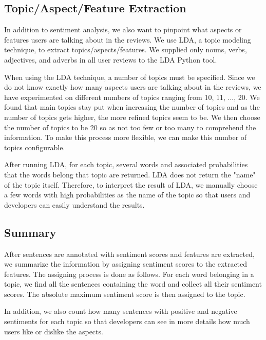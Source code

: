 \subsection{Topic/Aspect/Feature Extraction}
In addition to sentiment analysis, we also want to pinpoint what aspects or features users are talking about in the reviews. We use LDA, a topic modeling technique, to extract topics/aspects/features. We supplied only nouns, verbs, adjectives, and adverbs in all user reviews to the LDA Python tool. 

When using the LDA technique, a number of topics must be specified. Since we do not know exactly how many aspects users are talking about in the reviews, we have experimented on different numbers of topics ranging from 10, 11, ..., 20. We found that main topics stay put when increasing the number of topics and as the number of topics gets higher, the more refined topics seem to be. We then choose the number of topics to be 20 so as not too few or too many to comprehend the information. To make this process more flexible, we can make this number of topics configurable.

After running LDA, for each topic, several words and associated probabilities that the words belong that topic are returned. LDA does not return the "name" of the topic itself. Therefore, to interpret the result of LDA, we manually choose a few words with high probabilities as the name of the topic so that users and developers can easily understand the results.

\subsection{Summary}
\label{Summary}
After sentences are annotated with sentiment scores and features are extracted, we summarize the information by assigning sentiment scores to the extracted features. The assigning process is done as follows. For each word belonging in a topic, we find all the sentences containing the word and collect all their sentiment scores. The absolute maximum sentiment score is then assigned to the topic.

In addition, we also count how many sentences with positive and negative sentiments for each topic so that developers can see in more details how much users like or dislike the aspects. 


